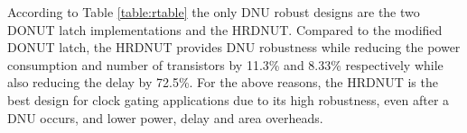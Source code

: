 According to Table \ref{table:rtable} the only DNU robust designs are the two DONUT latch implementations and the HRDNUT. Compared to the modified DONUT latch, the HRDNUT provides DNU robustness while reducing the power consumption and number of transistors by 11.3\% and 8.33\% respectively while also reducing the delay by 72.5\%. For the above reasons, the HRDNUT is the best design for clock gating applications due to its high robustness, even after a DNU occurs, and lower power, delay and area overheads.